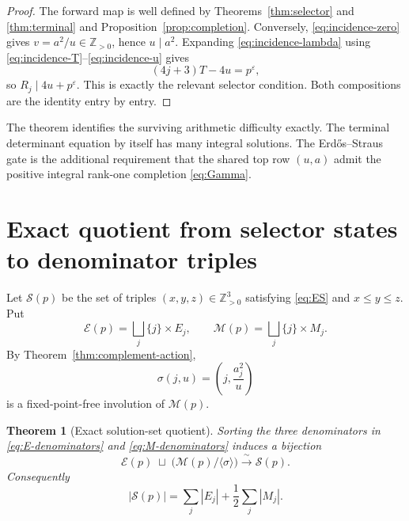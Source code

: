 \documentclass[11pt]{article}
\newtheorem{theorem}{Theorem}[section]
\theoremstyle{definition}
\theoremstyle{remark}
\newcommand{\Z}{\mathbb Z}
\begin{document}
\begin{proof}
The forward map is well defined by Theorems~\ref{thm:selector} and
\ref{thm:terminal} and Proposition~\ref{prop:completion}.  Conversely,
\eqref{eq:incidence-zero} gives $v=a^2/u\in\Z_{>0}$, hence $u\mid a^2$.
Expanding \eqref{eq:incidence-lambda} using
\eqref{eq:incidence-T}--\eqref{eq:incidence-u} gives
\[
 (4j+3)T-4u=p^\varepsilon,
\]
so $R_j\mid4u+p^\varepsilon$.  This is exactly the relevant selector
condition.  Both compositions are the identity entry by entry.
\end{proof}

The theorem identifies the surviving arithmetic difficulty exactly.  The
terminal determinant equation by itself has many integral solutions.  The
Erd\H{o}s--Straus gate is the additional requirement that the shared top row
$(u,a)$ admit the positive integral rank-one completion \eqref{eq:Gamma}.


\section{Exact quotient from selector states to denominator triples}

Let \(\mathscr S(p)\) be the set of triples
\((x,y,z)\in\Z_{>0}^3\) satisfying \eqref{eq:ES} and
\(x\le y\le z\).  Put
\begin{equation}\label{eq:EM-global-sets}
 \mathcal E(p)=\bigsqcup_j\{j\}\times E_j,
 \qquad
 \mathcal M(p)=\bigsqcup_j\{j\}\times M_j.
\end{equation}
By Theorem~\ref{thm:complement-action},
\begin{equation}\label{eq:M-involution}
 \sigma(j,u)=\left(j,\frac{a_j^2}{u}\right)
\end{equation}
is a fixed-point-free involution of \(\mathcal M(p)\).

\begin{theorem}[Exact solution-set quotient]
\label{thm:solution-quotient}
Sorting the three denominators in
\eqref{eq:E-denominators} and \eqref{eq:M-denominators} induces a bijection
\begin{equation}\label{eq:solution-quotient}
 \boxed{
 \mathcal E(p)\;\sqcup\;
 \bigl(\mathcal M(p)/\langle\sigma\rangle\bigr)
 \xrightarrow{\ \sim\ }
 \mathscr S(p).}
\end{equation}
Consequently
\begin{equation}\label{eq:solution-count}
 |\mathscr S(p)|
 =\sum_j|E_j|+\frac12\sum_j|M_j|.
\end{equation}
\end{theorem}
\end{document}
